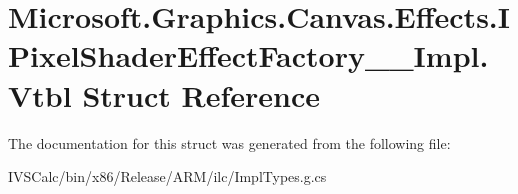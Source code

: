 \hypertarget{struct_microsoft_1_1_graphics_1_1_canvas_1_1_effects_1_1_i_pixel_shader_effect_factory_____impl_1_1_vtbl}{}\section{Microsoft.\+Graphics.\+Canvas.\+Effects.\+I\+Pixel\+Shader\+Effect\+Factory\+\_\+\+\_\+\+Impl.\+Vtbl Struct Reference}
\label{struct_microsoft_1_1_graphics_1_1_canvas_1_1_effects_1_1_i_pixel_shader_effect_factory_____impl_1_1_vtbl}


The documentation for this struct was generated from the following file\+:\begin{DoxyCompactItemize}
\item 
I\+V\+S\+Calc/bin/x86/\+Release/\+A\+R\+M/ilc/Impl\+Types.\+g.\+cs\end{DoxyCompactItemize}
